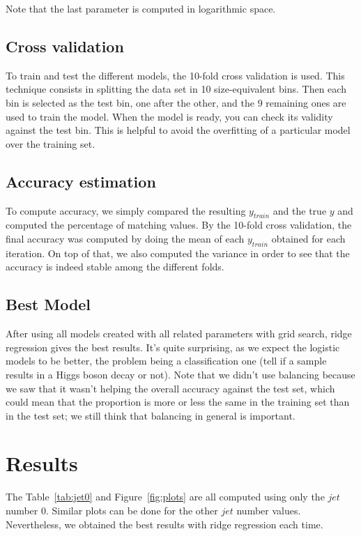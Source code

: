 \documentclass[10pt,conference,compsocconf]{IEEEtran}
\begin{document}
Note that the last parameter is computed in logarithmic space.


\subsection{Cross validation}
To train and test the different models, the 10-fold cross validation is used. This technique consists in splitting the data set in 10 size-equivalent bins. Then each bin is selected as the test bin, one after the other, and the 9 remaining ones are used to train the model. When the model is ready, you can check its validity against the test bin. This is helpful to avoid the overfitting of a particular model over the training set.

\subsection{Accuracy estimation}

To compute accuracy, we simply compared the resulting $y_{train}$ and the true $y$ and computed the percentage of matching values. By the 10-fold cross validation, the final accuracy was computed by doing the mean of each $y_{train}$ obtained for each iteration. On top of that, we also computed the variance in order to see that the accuracy is indeed stable among the different folds.

\subsection{Best Model}

After using all models created with all related parameters with grid search, ridge regression gives the best results. It's quite surprising, as we expect the logistic models to be better, the problem being a classification one (tell if a sample results in a Higgs boson decay or not). Note that we didn't use balancing because we saw that it wasn't helping the overall accuracy against the test set, which could mean that the proportion is more or less the same in the training set than in the test set; we still think that balancing in general is important.

\section{Results}

The Table~\ref{tab:jet0} and Figure~\ref{fig:plots} are all computed using only the $jet$ number 0. Similar plots can be done for the other $jet$ number values. Nevertheless, we obtained the best results with ridge regression each time. 
\end{document}
